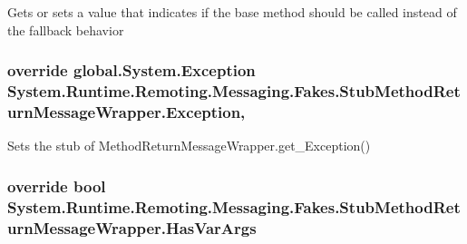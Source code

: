 Gets or sets a value that indicates if the base method should be called instead of the fallback behavior

\hypertarget{class_system_1_1_runtime_1_1_remoting_1_1_messaging_1_1_fakes_1_1_stub_method_return_message_wrapper_aed315c6ac968d19a3351e5bec6022617}{
\subsubsection[{Exception}]{\setlength{\rightskip}{0pt plus 5cm}override global.\-System.\-Exception System.\-Runtime.\-Remoting.\-Messaging.\-Fakes.\-Stub\-Method\-Return\-Message\-Wrapper.\-Exception\hspace{0.3cm}{\ttfamily [get]}, {\ttfamily [set]}}}\label{class_system_1_1_runtime_1_1_remoting_1_1_messaging_1_1_fakes_1_1_stub_method_return_message_wrapper_aed315c6ac968d19a3351e5bec6022617}


Sets the stub of Method\-Return\-Message\-Wrapper.\-get\-\_\-\-Exception()

\hypertarget{class_system_1_1_runtime_1_1_remoting_1_1_messaging_1_1_fakes_1_1_stub_method_return_message_wrapper_a5e23a08f36cc86b916776e07137562e2}{
\subsubsection[{Has\-Var\-Args}]{\setlength{\rightskip}{0pt plus 5cm}override bool System.\-Runtime.\-Remoting.\-Messaging.\-Fakes.\-Stub\-Method\-Return\-Message\-Wrapper.\-Has\-Var\-Args\hspace{0.3cm}{\ttfamily [get]}}}\label{class_system_1_1_runtime_1_1_remoting_1_1_messaging_1_1_fakes_1_1_stub_method_return_message_wrapper_a5e23a08f36cc86b916776e07137562e2}


